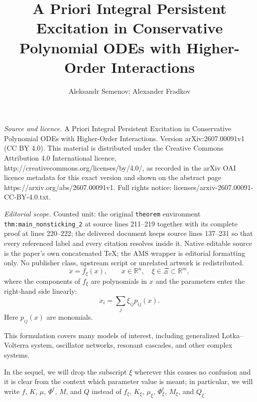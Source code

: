 \documentclass[10pt,a4paper]{amsart}
\newcommand{\R}{\mathbb{R}}
\begin{document}
\title[A Priori Integral Persistent Excitation in Conservative Poly]{A Priori Integral Persistent Excitation in Conservative Polynomial ODEs with Higher-Order Interactions}
\author{Aleksandr Semenov; Alexander Fradkov}
\date{}
\maketitle
\noindent\emph{Source and licence.} A Priori Integral Persistent Excitation in Conservative Polynomial ODEs with Higher-Order Interactions. Version arXiv:2607.00091v1 (CC BY 4.0). This material is distributed under the Creative Commons Attribution 4.0 International licence, http://creativecommons.org/licenses/by/4.0/, as recorded in the arXiv OAI licence metadata for this exact version and shown on the abstract page https://arxiv.org/abs/2607.00091v1. Full rights notice: licenses/arxiv-2607.00091-CC-BY-4.0.txt.\par\smallskip
\noindent\textit{Editorial scope.} Counted unit: the original \texttt{theorem} environment \texttt{thm:main\_nonsticking\_2} at source lines 211--219 together with its complete proof at lines 220--222; the delivered document keeps source lines 137--231 so that every referenced label and every citation resolves inside it. Native editable source is the paper's own concatenated TeX; the AMS wrapper is editorial formatting only. No publisher class, upstream script or unrelated artwork is redistributed.
\begin{equation}\label{eq:polynomial_system_2}
    \dot x=f_\xi(x),\qquad x\in\R^n,
    \quad \xi\in\Xi\subset\R^m,
\end{equation}
where the components of $f_\xi$ are polynomials in $x$ and the parameters enter the right‑hand side linearly:
\begin{equation}\label{eq:linear_parameterization_2}
    \dot{x}_i=\sum_{j}\xi_{ij}p_{ij}(x).
\end{equation}
Here $p_{ij}(x)$ are monomials. 

This formulation covers many models of interest, including generalized Lotka--Volterra system, oscillator networks, resonant cascades, and other complex systems.


In the sequel, we will drop the subscript $\xi$ wherever this causes no confusion and it is clear from the context which parameter value is meant; in particular, we will write $f$, $K$, $\mu$, $\Phi^t$, $M$, and $Q$ instead of $f_\xi$, $K_\xi$, $\mu_\xi$, $\Phi_\xi^t$, $M_\xi$, and $Q_\xi$.
\end{document}
